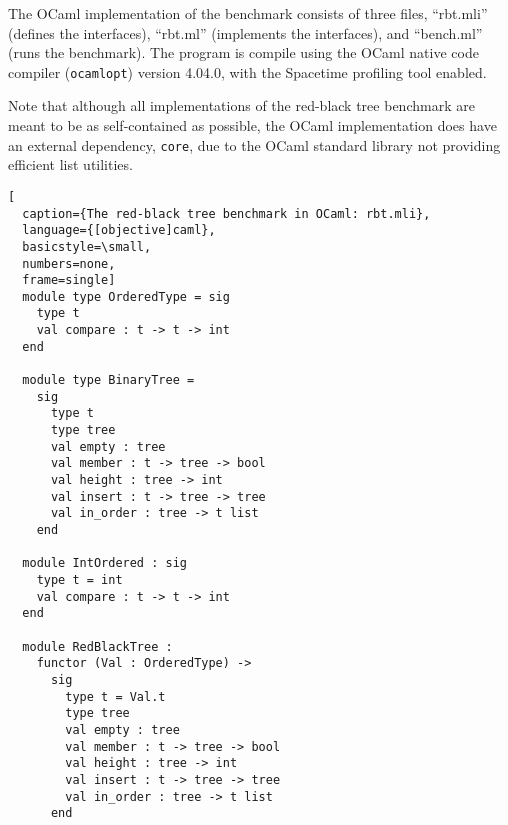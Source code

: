 \newpage
The OCaml implementation of the benchmark consists of three files, ``rbt.mli'' (defines the interfaces),
``rbt.ml'' (implements the interfaces), and ``bench.ml'' (runs the benchmark). The program is compile using
the OCaml native code compiler (\lstinline{ocamlopt}) version 4.04.0, with the Spacetime profiling
tool enabled.

Note that although all implementations of the red-black tree benchmark are meant to be as self-contained as
possible, the OCaml implementation does have an external dependency, \lstinline{core}, due to the OCaml standard
library not providing efficient list utilities.

\begin{lstlisting}[
  caption={The red-black tree benchmark in OCaml: rbt.mli},
  language={[objective]caml},
  basicstyle=\small,
  numbers=none,
  frame=single]
  module type OrderedType = sig
    type t
    val compare : t -> t -> int
  end 
                                
  module type BinaryTree =
    sig
      type t
      type tree
      val empty : tree
      val member : t -> tree -> bool
      val height : tree -> int
      val insert : t -> tree -> tree
      val in_order : tree -> t list
    end
    
  module IntOrdered : sig
    type t = int
    val compare : t -> t -> int
  end

  module RedBlackTree :
    functor (Val : OrderedType) ->
      sig
        type t = Val.t
        type tree
        val empty : tree
        val member : t -> tree -> bool
        val height : tree -> int
        val insert : t -> tree -> tree
        val in_order : tree -> t list
      end
\end{lstlisting}

